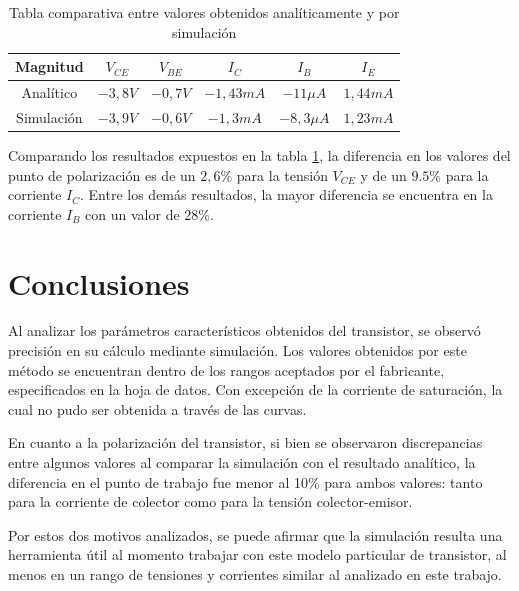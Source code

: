\documentclass[10pt]{article}
\begin{document}
\begin{table}[H]
    \centering
    \begin{tabular}{c|c|c|c|c|c}
         Magnitud & $V_{CE}$ & $V_{BE}$  & $I_C$  & $I_B$ & $I_E$ \\
         \hline
         Analítico & $-3,8 V$ & $-0,7V$  & $-1,43mA$ & $-11\mu A$& $1,44 mA$ \\
         Simulación & $-3,9 V$&$-0,6V$&$-1,3mA$&$-8,3\mu A$ & $1,23mA$ \\
         \hline
    \end{tabular}
    \caption{Tabla comparativa entre valores obtenidos analíticamente y por simulación}
    \label{tab:TablaPolarizacion}
\end{table}

Comparando los resultados expuestos en la tabla \ref{tab:TablaPolarizacion}, la diferencia en los valores del punto de polarización es de un $2,6\%$ para la tensión $V_{CE}$ y de un $9.5\%$ para la corriente $I_C$. 
Entre los demás resultados, la mayor diferencia se encuentra en la corriente $I_B$ con un valor de $28\%$. 
\section{Conclusiones}

Al analizar los parámetros característicos obtenidos del transistor, se observó precisión en su cálculo mediante simulación. Los valores obtenidos por este método se encuentran dentro de los rangos aceptados por el fabricante, especificados en la hoja de datos. Con excepción de la corriente de saturación, la cual no pudo ser obtenida a través de las curvas.

En cuanto a la polarización del transistor, si bien se observaron discrepancias entre algunos valores al comparar la simulación con el resultado analítico, la diferencia en el punto de trabajo fue menor al 10\% para ambos valores: tanto para la corriente de colector como para la tensión colector-emisor.


Por estos dos motivos analizados, se puede afirmar que la simulación resulta una herramienta útil al momento trabajar con este modelo particular de transistor, al menos en un rango de tensiones y corrientes similar al analizado en este trabajo.
\end{document}
